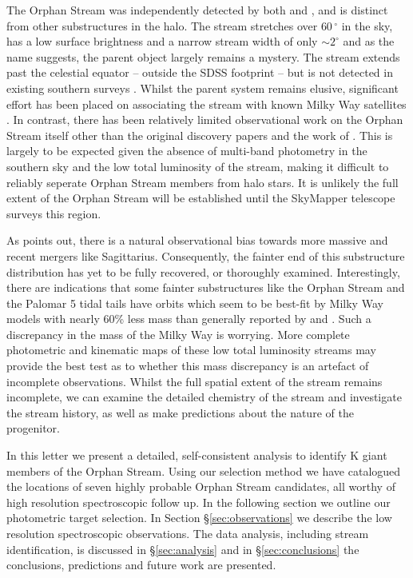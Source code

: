 \documentclass{emulateapj}
\begin{document}
The Orphan Stream was independently detected by both \citet{Grillmair;Dionatos_2006} and \citet{Belokurov;et-al_2006}, and is distinct from other substructures in the halo. The stream stretches over $60\,^\circ$ in the sky, has a low surface brightness and a narrow stream width of only $\sim2^\circ$ and as the name suggests, the parent object largely remains a mystery. The stream extends past the celestial equator \--- outside the SDSS footprint \--- but is not detected in existing southern surveys \citep{Newberg;et-al_2010}. Whilst the parent system remains elusive, significant effort has been placed on associating the stream with known Milky Way satellites \citep{Zucker;et-al_2006, Fellhaur;et-al_2007,Jin;Lynden_Bell_2007,Sales;et-al_2008}. In contrast, there has been relatively limited observational work on the Orphan Stream itself other than the original discovery papers \citep{Grillmair;Dionatos_2006, Belokurov;et-al_2006, Belokurov;et-al_2007} and the work of \citet{Newberg;et-al_2010}. This is largely to be expected given the absence of multi-band photometry in the southern sky and the low total luminosity of the stream, making it difficult to reliably seperate Orphan Stream members from halo stars. It is unlikely the full extent of the Orphan Stream will be established until the SkyMapper telescope \citep{Keller;et-al_2007} surveys this region. 

As \citet{Sales;et-al_2008} points out, there is a natural observational bias towards more massive and recent mergers like Sagittarius. Consequently, the fainter end of this substructure distribution has yet to be fully recovered, or thoroughly examined. Interestingly, there are indications that  some fainter substructures like the Orphan Stream \citep{Newberg;et-al_2010} and the Palomar 5 tidal tails \citep{Odenkirchen;et-al_2009} have orbits which seem to be best-fit by Milky Way models with nearly 60\% less mass \citep{Newberg;et-al_2010} than generally reported by \citet{Xue;et-al_2008} and \citet{Koposov;et-al_2010}. Such a discrepancy in the mass of the Milky Way is worrying. More complete photometric and kinematic maps of these low total luminosity streams may provide the best test as to whether this mass discrepancy is an artefact of incomplete observations. Whilst the full spatial extent of the stream remains incomplete, we can examine the detailed chemistry of the stream and investigate the stream history, as well as make predictions about the nature of the progenitor.

In this letter we present a detailed, self-consistent analysis to identify K giant members of the Orphan Stream. Using our selection method we have catalogued the locations of seven highly probable Orphan Stream candidates, all worthy of high resolution spectroscopic follow up. In the following section we outline our photometric target selection. In Section \S\ref{sec:observations} we describe the low resolution spectroscopic observations. The data analysis, including stream identification, is discussed in \S\ref{sec:analysis} and in \S\ref{sec:conclusions} the conclusions, predictions and future work are presented.
\end{document}
